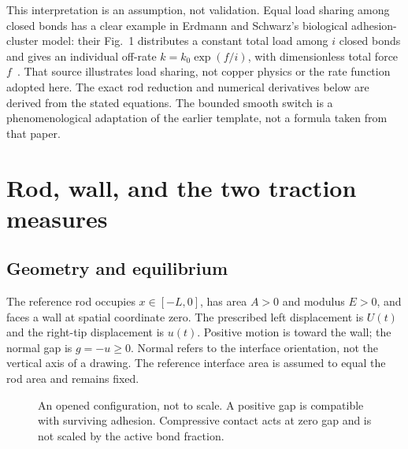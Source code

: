\documentclass[11pt,a4paper]{article}
\begin{document}
This interpretation is an assumption, not validation. Equal load sharing
among closed bonds has a clear example in Erdmann and Schwarz's biological
adhesion-cluster model: their Fig.~1 distributes a constant total load among
$i$ closed bonds and gives an individual off-rate $k=k_0\exp(f/i)$, with
dimensionless total force $f$~\cite{erdmann2004}. That source illustrates load
sharing, not copper physics or the rate function adopted here. The exact rod
reduction and numerical derivatives below are derived from the stated
equations. The bounded smooth switch is a phenomenological adaptation of the
earlier template, not a formula taken from that paper.

\section{Rod, wall, and the two traction measures}

\subsection{Geometry and equilibrium}

The reference rod occupies $x\in[-L,0]$, has area $A>0$ and modulus $E>0$,
and faces a wall at spatial coordinate zero. The prescribed left displacement
is $U(t)$ and the right-tip displacement is $u(t)$. Positive motion is toward
the wall; the normal gap is $g=-u\geq0$. Normal refers to the interface
orientation, not the vertical axis of a drawing. The reference interface area
is assumed to equal the rod area and remains fixed.

\begin{figure}[htbp]
\centering
{}
\caption{An opened configuration, not to scale. A positive gap is compatible
with surviving adhesion. Compressive contact acts at zero gap and is not scaled
by the active bond fraction.}
\end{figure}
\end{document}
